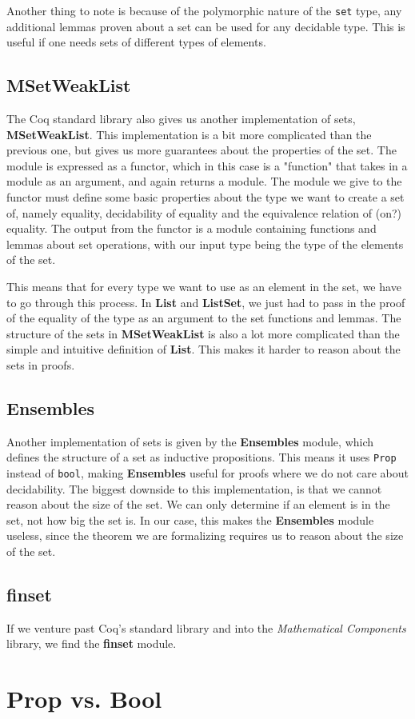Another thing to note is because of the polymorphic nature of the \lstinline{set} type, any additional lemmas proven about a set can be
used for any decidable type. This is useful if one needs sets of different types of elements.

\subsection{MSetWeakList}

The Coq standard library also gives us another implementation of sets, \textbf{MSetWeakList}.
This implementation is a bit more complicated than the previous one,
but gives us more guarantees about the properties of the set.
The module is expressed as a functor, which in this case is a "function" that takes in a module as an argument, and again returns a module.
The module we give to the functor must define some basic properties about the type we want to create a set of,
namely equality, decidability of equality and the equivalence relation of (on?) equality.
The output from the functor is a module containing functions and lemmas about set operations,
with our input type being the type of the elements of the set.

This means that for every type we want to use as an element in the set, we have to go through this process.
In \textbf{List} and \textbf{ListSet}, we just had to pass in the proof of the equality of the type as an argument to the set functions and lemmas.
The structure of the sets in \textbf{MSetWeakList} is also a lot more complicated than the simple and intuitive definition of \textbf{List}.
This makes it harder to reason about the sets in proofs.

\subsection{Ensembles}

Another implementation of sets is given by the \textbf{Ensembles} module, which defines the structure of a set as inductive propositions.
This means it uses \lstinline[language=Coq]{Prop} instead of \lstinline[language=Coq]{bool},
making \textbf{Ensembles} useful for proofs where we do not care about decidability.
The biggest downside to this implementation, is that we cannot reason about the size of the set.
We can only determine if an element is in the set, not how big the set is.
In our case, this makes the \textbf{Ensembles} module useless, since the theorem we are formalizing requires us to reason about the
size of the set.

\subsection{finset}

If we venture past Coq's standard library and into the \textit{Mathematical Components} library, we find the \textbf{finset} module.

\section{Prop vs. Bool}
